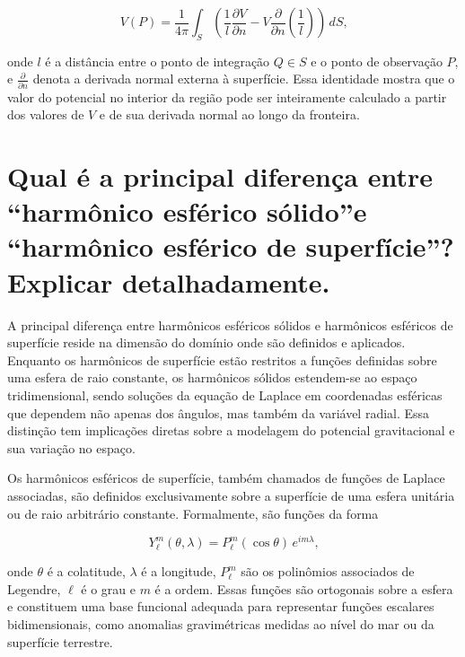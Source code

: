 \[
V(P) = \frac{1}{4\pi} \int_S \left( \frac{1}{l} \frac{\partial V}{\partial n} - V \frac{\partial}{\partial n} \left( \frac{1}{l} \right) \right) \, dS \text{,}
\]

\noindent
onde \( l \) é a distância entre o ponto de integração \( Q \in S \) e o ponto de observação \( P \), e \( \frac{\partial}{\partial n} \) denota a derivada normal externa à superfície. Essa identidade mostra que o valor do potencial no interior da região pode ser inteiramente calculado a partir dos valores de \( V \) e de sua derivada normal ao longo da fronteira.




\section{Qual é a principal diferença entre “harmônico esférico sólido”e “harmônico esférico de superfície”? Explicar detalhadamente.}


A principal diferença entre harmônicos esféricos sólidos e harmônicos esféricos de superfície reside na dimensão do domínio onde são definidos e aplicados. Enquanto os harmônicos de superfície estão restritos a funções definidas sobre uma esfera de raio constante, os harmônicos sólidos estendem-se ao espaço tridimensional, sendo soluções da equação de Laplace em coordenadas esféricas que dependem não apenas dos ângulos, mas também da variável radial. Essa distinção tem implicações diretas sobre a modelagem do potencial gravitacional e sua variação no espaço.

Os harmônicos esféricos de superfície, também chamados de funções de Laplace associadas, são definidos exclusivamente sobre a superfície de uma esfera unitária ou de raio arbitrário constante. Formalmente, são funções da forma

\[
Y_\ell^m(\theta, \lambda) = P_\ell^m(\cos\theta) \, e^{im\lambda} \text{,}
\]

\noindent
onde \( \theta \) é a colatitude, \( \lambda \) é a longitude, \( P_\ell^m \) são os polinômios associados de Legendre, \( \ell \) é o grau e \( m \) é a ordem. Essas funções são ortogonais sobre a esfera e constituem uma base funcional adequada para representar funções escalares bidimensionais, como anomalias gravimétricas medidas ao nível do mar ou da superfície terrestre. 

